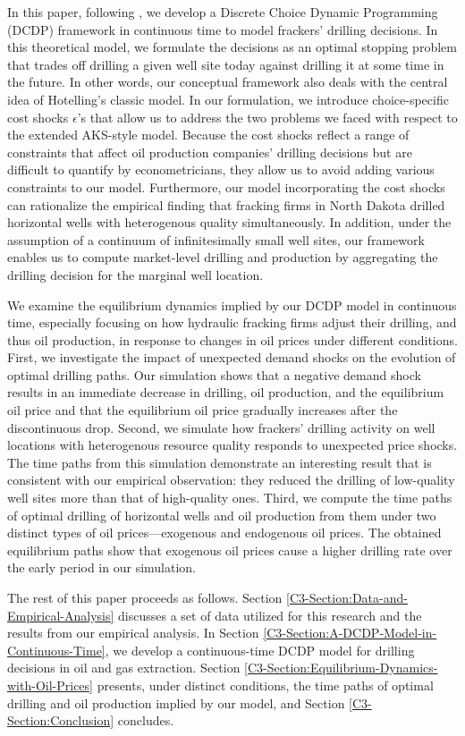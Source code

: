 In this paper, following \cite{Estimation-of-Dynamic-Discrete-Choice-Models-in-Continuous-Time_ABBE_2016}, we develop a Discrete Choice Dynamic Programming (DCDP) framework in continuous time to model frackers' drilling decisions. In this theoretical model, we formulate the decisions as an optimal stopping problem that trades off drilling a given well site today against drilling it at some time in the future. In other words, our conceptual framework also deals with the central idea of Hotelling's classic model. In our formulation, we introduce choice-specific cost shocks $\epsilon$'s that allow us to address the two problems we faced with respect to the extended AKS-style model. Because the cost shocks reflect a range of constraints that affect oil production companies' drilling decisions but are difficult to quantify by econometricians, they allow us to avoid adding various constraints to our model. Furthermore, our model incorporating the cost shocks can rationalize the empirical finding that fracking firms in North Dakota drilled horizontal wells with heterogenous quality simultaneously. In addition, under the assumption of a continuum of infinitesimally small well sites, our framework enables us to compute market-level drilling and production by aggregating the drilling decision for the marginal well location. 

We examine the equilibrium dynamics implied by our DCDP model in continuous time, especially focusing on how hydraulic fracking firms adjust their drilling, and thus oil production, in response to changes in oil prices under different conditions. First, we investigate the impact of unexpected demand shocks on the evolution of optimal drilling paths. Our simulation shows that a negative demand shock results in an immediate decrease in drilling, oil production, and the equilibrium oil price and that the equilibrium oil price gradually increases after the discontinuous drop. Second, we simulate how frackers' drilling activity on well locations with heterogenous resource quality responds to unexpected price shocks. The time paths from this simulation demonstrate an interesting result that is consistent with our empirical observation: they reduced the drilling of low-quality well sites more than that of high-quality ones. Third, we compute the time paths of optimal drilling of horizontal wells and oil production from them under two distinct types of oil prices---exogenous and endogenous oil prices. The obtained equilibrium paths show that exogenous oil prices cause a higher drilling rate over the early period in our simulation. 

The rest of this paper proceeds as follows. Section \ref{C3-Section:Data-and-Empirical-Analysis} discusses a set of data utilized for this research and the results from our empirical analysis. In Section \ref{C3-Section:A-DCDP-Model-in-Continuous-Time}, we develop a continuous-time DCDP model for drilling decisions in oil and gas extraction. Section \ref{C3-Section:Equilibrium-Dynamics-with-Oil-Prices} presents, under distinct conditions, the time paths of optimal drilling and oil production implied by our model, and Section \ref{C3-Section:Conclusion} concludes. 
